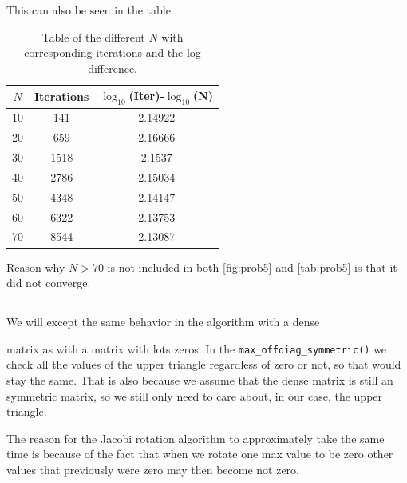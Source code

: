 \documentclass[a4paper,10pt,english]{article}
\begin{document}
			This can also be seen in the table
			\begin{table}
			  \centering
			  \caption{Table of the different $N$ with corresponding iterations and the log difference. \label{tab:prob5}}
			  \begin{tabular}{||c|c|c||}
				\hline
				$N$              &Iterations    &$\log_{10}$(Iter)-$\log_{10}$(N)               \\
				\hline
				\hline
                      10                     &141                 &2.14922                       \\
				\hline
                      20                     &659                 &2.16666                       \\
				\hline
                      30                    &1518                  &2.1537                       \\
				\hline
                      40                    &2786                 &2.15034                       \\
				\hline
                      50                    &4348                 &2.14147                       \\
				\hline
                      60                    &6322                 &2.13753                       \\
				\hline
                      70                    &8544                 &2.13087                       \\
				\hline
			  \end{tabular}
			  \end{table}
			  Reason why $N>70$ is not included in both \autoref{fig:prob5} and \autoref{tab:prob5} is that it did not converge.


			\subsection{}

We will except the same behavior in the algorithm with a dense

matrix as with a matrix with lots zeros. In the \lstinline{max_offdiag_symmetric()}
we check all the values of the upper triangle regardless of zero or
not, so that would stay the same. That is also because we assume that
the dense matrix is still an symmetric matrix, so we still only need
to care about, in our case, the upper triangle.


The reason for the Jacobi rotation algorithm to approximately take the
same time is because of the fact that when we rotate one max value to
be zero other values that previously were zero may then become not
zero. \cite{morten:compphys}
\end{document}
